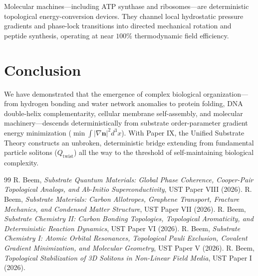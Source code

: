 \documentclass[11pt,a4paper]{article}
\begin{document}
	Molecular machines—including ATP synthase and ribosomes—are deterministic topological energy-conversion devices. They channel local hydrostatic pressure gradients and phase-lock transitions into directed mechanical rotation and peptide synthesis, operating at near $100\%$ thermodynamic field efficiency.
	
	\section{Conclusion}
	\label{sec:conclusion}
	
	We have demonstrated that the emergence of complex biological organization—from hydrogen bonding and water network anomalies to protein folding, DNA double-helix complementarity, cellular membrane self-assembly, and molecular machinery—descends deterministically from substrate order-parameter gradient energy minimization ($\min \int |\nabla \mathbf{n}|^2 d^3x$). With Paper IX, the Unified Substrate Theory constructs an unbroken, deterministic bridge extending from fundamental particle solitons ($Q_{\text{twist}}$) all the way to the threshold of self-maintaining biological complexity.
	
	\begin{thebibliography}{99}
		 R. Beem, \textit{Substrate Quantum Materials: Global Phase Coherence, Cooper-Pair Topological Analogs, and Ab-Initio Superconductivity}, UST Paper VIII (2026).
		 R. Beem, \textit{Substrate Materials: Carbon Allotropes, Graphene Transport, Fracture Mechanics, and Condensed Matter Structure}, UST Paper VII (2026).
		 R. Beem, \textit{Substrate Chemistry II: Carbon Bonding Topologies, Topological Aromaticity, and Deterministic Reaction Dynamics}, UST Paper VI (2026).
		 R. Beem, \textit{Substrate Chemistry I: Atomic Orbital Resonances, Topological Pauli Exclusion, Covalent Gradient Minimization, and Molecular Geometry}, UST Paper V (2026).
		 R. Beem, \textit{Topological Stabilization of 3D Solitons in Non-Linear Field Media}, UST Paper I (2026).
	\end{thebibliography}
	
\end{document}
